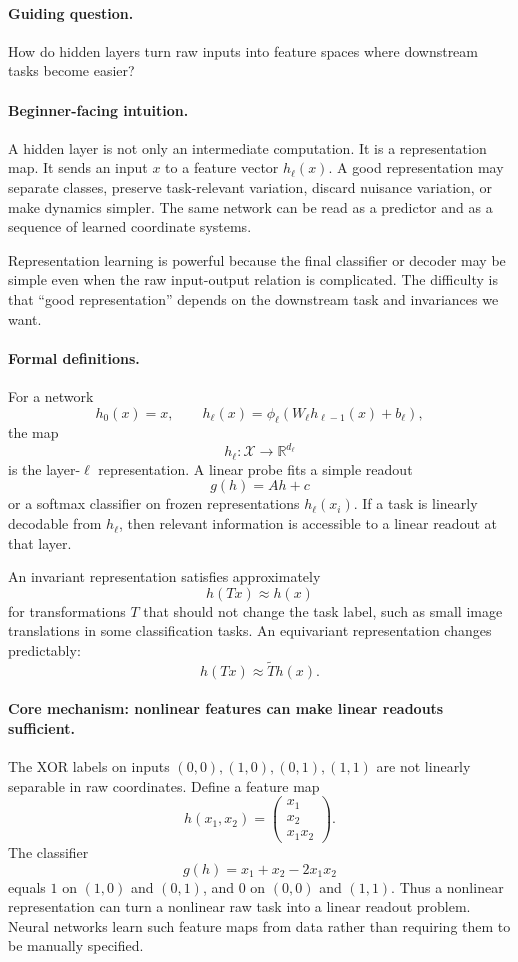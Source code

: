 \paragraph{Guiding question.}
How do hidden layers turn raw inputs into feature spaces where downstream tasks become easier?

\paragraph{Beginner-facing intuition.}
A hidden layer is not only an intermediate computation. It is a representation map. It sends an input \(x\) to a feature vector \(h_\ell(x)\). A good representation may separate classes, preserve task-relevant variation, discard nuisance variation, or make dynamics simpler. The same network can be read as a predictor and as a sequence of learned coordinate systems.

Representation learning is powerful because the final classifier or decoder may be simple even when the raw input-output relation is complicated. The difficulty is that ``good representation'' depends on the downstream task and invariances we want.

\paragraph{Formal definitions.}
For a network
\[
h_0(x)=x,\qquad h_\ell(x)=\phi_\ell(W_\ell h_{\ell-1}(x)+b_\ell),
\]
the map
\[
\boxed{
h_\ell:\mathcal X\to\mathbb R^{d_\ell}
}
\]
is the layer-\(\ell\) representation. A linear probe fits a simple readout
\[
g(h)=Ah+c
\]
or a softmax classifier on frozen representations \(h_\ell(x_i)\). If a task is linearly decodable from \(h_\ell\), then relevant information is accessible to a linear readout at that layer.

An invariant representation satisfies approximately
\[
h(Tx)\approx h(x)
\]
for transformations \(T\) that should not change the task label, such as small image translations in some classification tasks. An equivariant representation changes predictably:
\[
h(Tx)\approx \widetilde T h(x).
\]

\paragraph{Core mechanism: nonlinear features can make linear readouts sufficient.}
The XOR labels on inputs \((0,0),(1,0),(0,1),(1,1)\) are not linearly separable in raw coordinates. Define a feature map
\[
h(x_1,x_2)=
\begin{pmatrix}
x_1\\
x_2\\
x_1x_2
\end{pmatrix}.
\]
The classifier
\[
g(h)=x_1+x_2-2x_1x_2
\]
equals \(1\) on \((1,0)\) and \((0,1)\), and \(0\) on \((0,0)\) and \((1,1)\). Thus a nonlinear representation can turn a nonlinear raw task into a linear readout problem. Neural networks learn such feature maps from data rather than requiring them to be manually specified.

